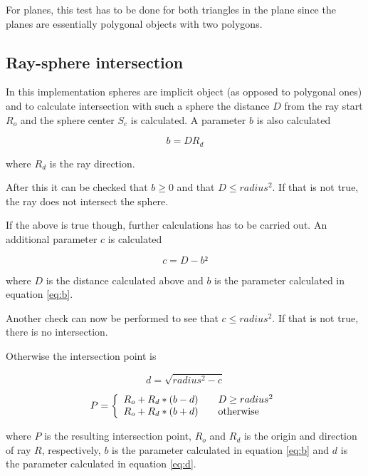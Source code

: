 \documentclass[a4paper]{report}
\begin{document}
For planes, this test has to be done for both triangles in the plane
since the planes are essentially polygonal objects with two polygons.

\subsection{Ray-sphere intersection}

In this implementation spheres are implicit object (as opposed to
polygonal ones) and to calculate intersection with such a sphere the
distance \(D\) from the ray start \(R_o\) and the sphere center \(S_c\) is
calculated. A parameter \(b\) is also calculated 

\begin{equation}
 b = D R_d
 \label{eq:b}
\end{equation}

where \(R_d\) is the ray direction.

After this it can be checked that \(b \geq 0\) and that \(D \leq
radius^2\). If that is not true, the ray does not intersect the
sphere.

If the above is true though, further calculations has to be carried
out. An additional parameter \(c\) is calculated

\begin{equation}
  c = D - b²
\end{equation}

where \(D\) is the distance calculated above and \(b\) is the
parameter calculated in equation \ref{eq:b}.

Another check can now be performed to see that \(c \leq radius^2\). If
that is not true, there is no intersection.

Otherwise the intersection point is

\begin{equation}
  d = \sqrt{radius^2 - c}
  \label{eq:d}
\end{equation}

\begin{equation}
  P = \left \{ 
  \begin{array}{l l}
    R_o + R_d *(b-d) & \quad D \geq radius^2 \\
    R_o + R_d *(b+d) & \quad \text{otherwise} \\
  \end{array} \right.
\end{equation}

where \(P\) is the resulting intersection point, \(R_o\) and \(R_d\)
is the origin and direction of ray \(R\), respectively, \(b\) is the
parameter calculated in equation \ref{eq:b} and \(d\) is the parameter
calculated in equation \ref{eq:d}.
\end{document}
